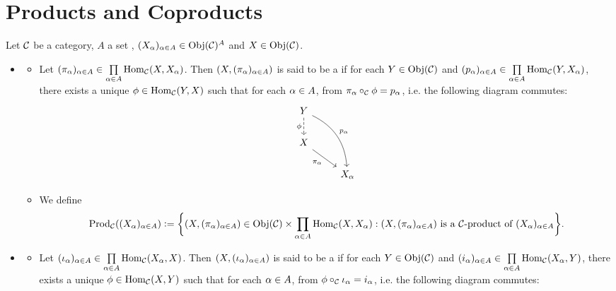 \documentclass{book}
\begin{document}
	
	
	
	
	
	\newpage
	\section{Products and Coproducts}
	
	\begin{defn}
		Let $\mathcal{C}$ be a category, $A$ a set , $(X_{\alpha})_{\alpha \in A} \in \operatorname{Obj}(\mathcal{C})^A$ and $X \in \operatorname{Obj}(\mathcal{C})$. 
		\begin{itemize}
			\item 
			\begin{itemize}
				\item Let $(\pi_{\alpha})_{\alpha \in A} \in \prod\limits_{\alpha \in A} \operatorname{Hom}_{\mathcal{C}}(X, X_{\alpha})$. Then $(X, (\pi_{\alpha})_{\alpha \in A})$ is said to be a  if for each $Y \in \operatorname{Obj}(\mathcal{C})$ and $(p_{\alpha})_{\alpha \in A} \in \prod\limits_{\alpha \in A} \operatorname{Hom}_{\mathcal{C}}(Y, X_{\alpha})$, there exists a unique $\phi \in \operatorname{Hom}_{\mathcal{C}}(Y, X)$ such that for each $\alpha \in A$, from $\pi_{\alpha} \circ_{\mathcal{C}} \phi = p_{\alpha}$, i.e. the following diagram commutes: 
				\[ 
				\begin{tikzcd}[baseline= 7]
					Y   \arrow[d, "\phi"', dashed]  \arrow[ddr, "p_{\al}"', bend left=30, swap]    &  \\
					X \arrow[dr, "\pi_{\al}"']                        & \\
					& X_{\al}   
				\end{tikzcd}
				\] 
				\item We define 
				$$\operatorname{Prod}_{\mathcal{C}}((X_{\alpha})_{\alpha \in A}) \vcentcolon= \bigg \{(X, (\pi_{\alpha})_{\alpha \in A}) \in \operatorname{Obj}(\mathcal{C}) \times \prod\limits_{\alpha \in A} \operatorname{Hom}_{\mathcal{C}}(X, X_{\alpha}): \text{$(X, (\pi_{\alpha})_{\alpha \in A})$ is a $\mathcal{C}$-product of $(X_{\alpha})_{\alpha \in A}$} \bigg \}.$$
			\end{itemize}
			\item 
			\begin{itemize}
				\item Let $(\iota_{\alpha})_{\alpha \in A} \in \prod\limits_{\alpha \in A} \operatorname{Hom}_{\mathcal{C}}(X_{\alpha}, X)$. Then $(X, (\iota_{\alpha})_{\alpha \in A})$ is said to be a  if for each $Y \in \operatorname{Obj}(\mathcal{C})$ and $(i_{\alpha})_{\alpha \in A} \in \prod\limits_{\alpha \in A}\operatorname{Hom}_{\mathcal{C}}(X_{\alpha}, Y)$, there exists a unique $\phi \in \operatorname{Hom}_{\mathcal{C}}(X, Y)$ such that for each $\alpha \in A$, from $\phi \circ_{\mathcal{C}} \iota_{\alpha} = i_{\alpha}$, i.e. the following diagram commutes: 
				\[ 
				\begin{tikzcd}[baseline= 7]

\end{tikzcd}\]
\end{itemize}
\end{itemize}
\end{defn}
\end{document}

